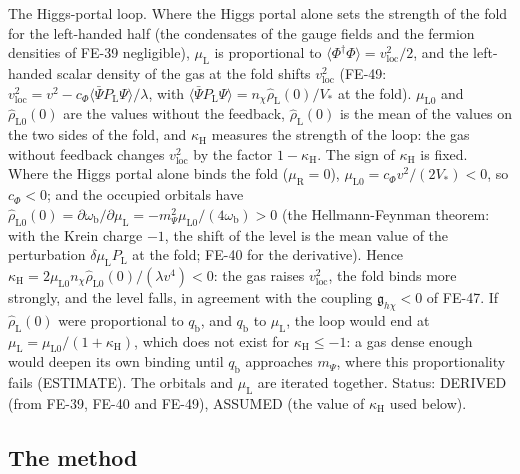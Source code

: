 \documentclass[
  10pt,
]{article}
\begin{document}
The Higgs-portal loop. Where the Higgs portal alone sets the strength of
the fold for the left-handed half (the condensates of the gauge fields
and the fermion densities of FE-39 negligible), \(\mu_{\mathrm{L}}\) is
proportional to
\(\langle\Phi^\dagger\Phi\rangle = v_{\mathrm{loc}}^2/2\), and the
left-handed scalar density of the gas at the fold shifts
\(v_{\mathrm{loc}}^2\) (FE-49:
\(v_{\mathrm{loc}}^2 = v^2 - c_\Phi\langle\bar\Psi P_{\mathrm{L}}\Psi\rangle/\lambda\),
with
\(\langle\bar\Psi P_{\mathrm{L}}\Psi\rangle = n_\chi\hat\rho_{\mathrm{L}}(0)/V_*\)
at the fold). \(\mu_{\mathrm{L}0}\) and \(\hat\rho_{\mathrm{L}0}(0)\)
are the values without the feedback, \(\hat\rho_{\mathrm{L}}(0)\) is the
mean of the values on the two sides of the fold, and
\(\kappa_{\mathrm{H}}\) measures the strength of the loop: the gas
without feedback changes \(v_{\mathrm{loc}}^2\) by the factor
\(1 - \kappa_{\mathrm{H}}\). The sign of \(\kappa_{\mathrm{H}}\) is
fixed. Where the Higgs portal alone binds the fold
(\(\mu_{\mathrm{R}} = 0\)),
\(\mu_{\mathrm{L}0} = c_\Phi v^2/(2V_*) < 0\), so \(c_\Phi < 0\); and
the occupied orbitals have
\(\hat\rho_{\mathrm{L}0}(0) = \partial\omega_{\mathrm{b}}/\partial\mu_{\mathrm{L}} = -m_\Psi^2\mu_{\mathrm{L}0}/(4\omega_{\mathrm{b}}) > 0\)
(the Hellmann-Feynman theorem: with the Krein charge \(-1\), the shift
of the level is the mean value of the perturbation
\(\delta\mu_{\mathrm{L}}P_{\mathrm{L}}\) at the fold; FE-40 for the
derivative). Hence
\(\kappa_{\mathrm{H}} = 2\mu_{\mathrm{L}0}n_\chi\hat\rho_{\mathrm{L}0}(0)/(\lambda v^4) < 0\):
the gas raises \(v_{\mathrm{loc}}^2\), the fold binds more strongly, and
the level falls, in agreement with the coupling
\(\mathfrak{g}_{h\chi} < 0\) of FE-47. If \(\hat\rho_{\mathrm{L}}(0)\)
were proportional to \(q_{\mathrm{b}}\), and \(q_{\mathrm{b}}\) to
\(\mu_{\mathrm{L}}\), the loop would end at
\(\mu_{\mathrm{L}} = \mu_{\mathrm{L}0}/(1 + \kappa_{\mathrm{H}})\),
which does not exist for \(\kappa_{\mathrm{H}} \le -1\): a gas dense
enough would deepen its own binding until \(q_{\mathrm{b}}\) approaches
\(m_\Psi\), where this proportionality fails (ESTIMATE). The orbitals
and \(\mu_{\mathrm{L}}\) are iterated together. Status: DERIVED (from
FE-39, FE-40 and FE-49), ASSUMED (the value of \(\kappa_{\mathrm{H}}\)
used below).

\hypertarget{the-method}{%
\subsection{The method}\label{the-method}}
\end{document}
